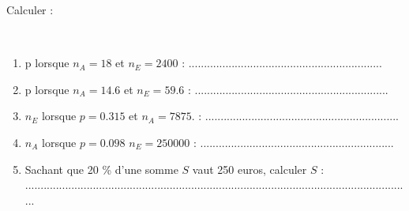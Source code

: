 Calculer :
\begin{questions}

	
	\question[5] \
	
	\begin{enumerate}[label=\alph*)]
		
		\item p lorsque $n_A=\num{18}$ et $n_E= \num{2400}$ : ...............................................................
		\item p lorsque $n_A=\num{14.6}$ et $n_E= \num{59.6} $ :  ...............................................................
		\item $n_E$ lorsque $p=\num{0.315} $ et $n_A=\num{7875}.$ : ...............................................................
		\item $n_A$ lorsque $p=\num{0.098}$ $n_E= \num{250000}$ : ...............................................................
		\item Sachant que 20 \% d'une somme $S$ vaut 250 euros, calculer $S$ :\\ ..............................................................................................................................
		\end{enumerate}
\end{questions}


